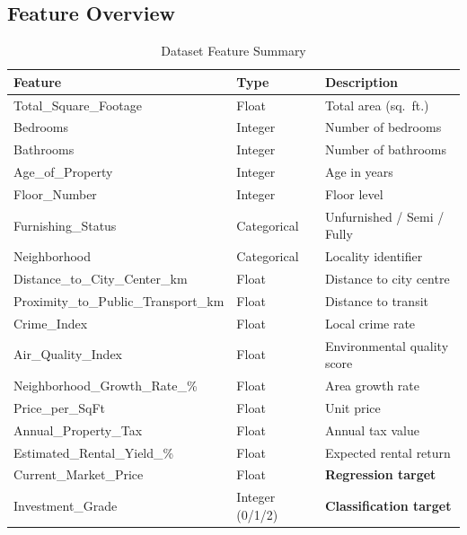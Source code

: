 \documentclass[12pt,a4paper]{article}
\begin{document}
\subsection{Feature Overview}

\begin{table}[H]
\centering
\caption{Dataset Feature Summary}
\begin{tabular}{@{} l l l @{}}
\toprule
\textbf{Feature} & \textbf{Type} & \textbf{Description} \\
\midrule
Total\_Square\_Footage           & Float    & Total area (sq.\ ft.) \\
Bedrooms                         & Integer  & Number of bedrooms \\
Bathrooms                        & Integer  & Number of bathrooms \\
Age\_of\_Property                & Integer  & Age in years \\
Floor\_Number                    & Integer  & Floor level \\
Furnishing\_Status               & Categorical & Unfurnished / Semi / Fully \\
Neighborhood                     & Categorical & Locality identifier \\
Distance\_to\_City\_Center\_km   & Float    & Distance to city centre \\
Proximity\_to\_Public\_Transport\_km & Float & Distance to transit \\
Crime\_Index                     & Float    & Local crime rate \\
Air\_Quality\_Index              & Float    & Environmental quality score \\
Neighborhood\_Growth\_Rate\_\%   & Float    & Area growth rate \\
Price\_per\_SqFt                 & Float    & Unit price \\
Annual\_Property\_Tax            & Float    & Annual tax value \\
Estimated\_Rental\_Yield\_\%     & Float    & Expected rental return \\
\midrule
\rowcolor{rowblue}
Current\_Market\_Price & Float & \textbf{Regression target} \\
\rowcolor{rowblue}
Investment\_Grade      & Integer (0/1/2) & \textbf{Classification target} \\
\bottomrule
\end{tabular}
\end{table}

\end{document}
